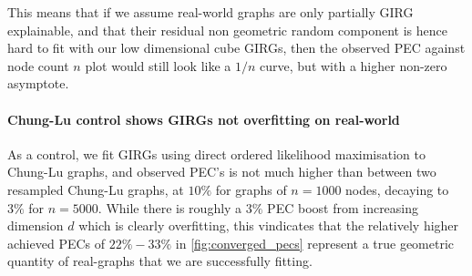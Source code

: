 This means that if we assume real-world graphs are only partially GIRG explainable, and that their residual non geometric random component is hence hard to fit with our low dimensional cube GIRGs, then the observed PEC against node count $n$ plot would still look like a $1/n$ curve, but with a higher non-zero asymptote.

\paragraph{Chung-Lu control shows GIRGs not overfitting on real-world}
As a control, we fit GIRGs using direct ordered likelihood maximisation to Chung-Lu graphs, and observed PEC's is not much higher than between two resampled Chung-Lu graphs, at $10\%$ for graphs of $n=1000$ nodes, decaying to $3\%$ for $n=5000$. While there is roughly a $3\%$ PEC boost from increasing dimension $d$ which is clearly overfitting, this vindicates that the relatively higher achieved PECs of $22\% - 33\%$ in \cref{fig:converged_pecs} represent a true geometric quantity of real-graphs that we are successfully fitting.




